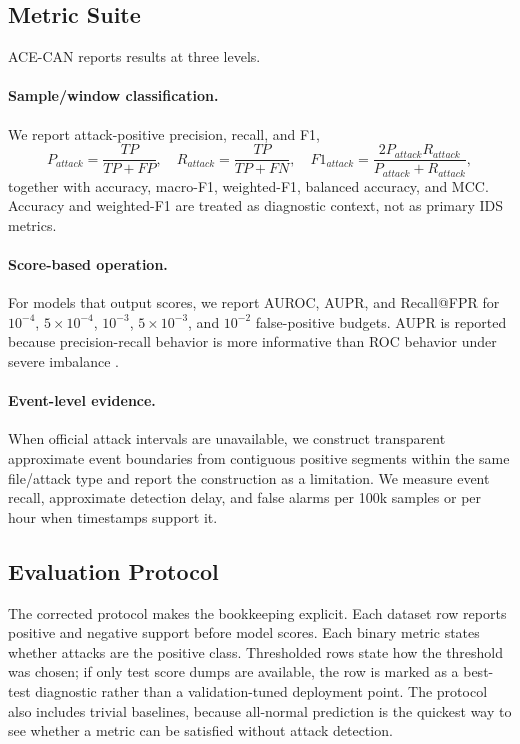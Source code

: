 \documentclass[runningheads]{llncs}%
\newcommand{\framework}{ACE-CAN}
\begin{document}
\subsection{Metric Suite}
\framework{} reports results at three levels.
\paragraph{Sample/window classification.}  We report attack-positive precision, recall, and F1,
\begin{equation}
    P_{attack}=\frac{TP}{TP+FP}, \quad R_{attack}=\frac{TP}{TP+FN}, \quad
    F1_{attack}=\frac{2P_{attack}R_{attack}}{P_{attack}+R_{attack}},
\end{equation}
together with accuracy, macro-F1, weighted-F1, balanced accuracy, and MCC.  Accuracy and weighted-F1 are treated as diagnostic context, not as primary IDS metrics.
\paragraph{Score-based operation.}  For models that output scores, we report AUROC, AUPR, and Recall@FPR for $10^{-4}$, $5\times10^{-4}$, $10^{-3}$, $5\times10^{-3}$, and $10^{-2}$ false-positive budgets.  AUPR is reported because precision-recall behavior is more informative than ROC behavior under severe imbalance \cite{davis2006pr,saito2015pr}.
\paragraph{Event-level evidence.}  When official attack intervals are unavailable, we construct transparent approximate event boundaries from contiguous positive segments within the same file/attack type and report the construction as a limitation.  We measure event recall, approximate detection delay, and false alarms per 100k samples or per hour when timestamps support it.

\subsection{Evaluation Protocol}
The corrected protocol makes the bookkeeping explicit.  Each dataset row reports positive and negative support before model scores.  Each binary metric states whether attacks are the positive class.  Thresholded rows state how the threshold was chosen; if only test score dumps are available, the row is marked as a best-test diagnostic rather than a validation-tuned deployment point.  The protocol also includes trivial baselines, because all-normal prediction is the quickest way to see whether a metric can be satisfied without attack detection.
\end{document}

